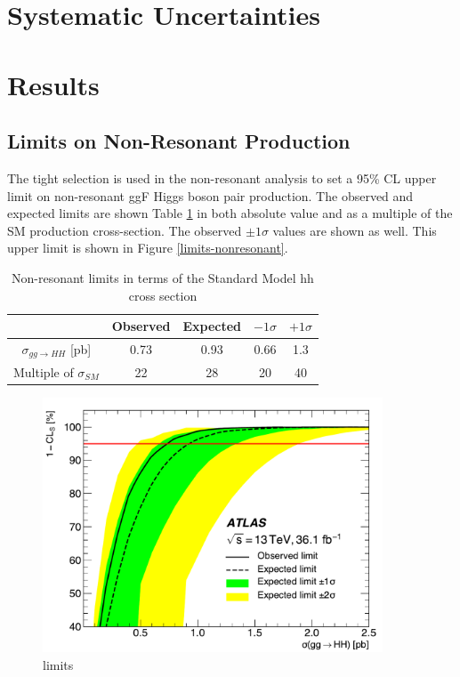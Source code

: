 \section{Systematic Uncertainties}
\section{Results}

\subsection{Limits on Non-Resonant Production}

The tight selection is used in the non-resonant analysis to set a 95\% \gls{CL} upper limit on non-resonant \gls{ggF} Higgs boson pair production. The observed and expected limits are shown Table \ref{tab:nonresonant_results_SM} in both absolute value and as a multiple of the \gls{SM} production cross-section. The observed $\pm 1\sigma$ values are shown as well. This upper limit is shown in Figure \ref{limits-nonresonant}.

\begin{table}[htbp]
  \centering 
  \caption{Non-resonant limits in terms of the Standard Model hh cross section}
  \label{tab:nonresonant_results_SM} 

  \begin{tabular}{ccccc}
  \hline
  & Observed & Expected & $-1\sigma$  & $+1\sigma$ \\
  \hline
  $\sigma_{gg\rightarrow HH}$ [pb] & 0.73 & 0.93 & 0.66 & 1.3\\
  Multiple of $\sigma_{SM}$ & 22 & 28 & 20 & 40 \\
  \hline
  \end{tabular}
\end{table}

\begin{figure}[htbp]
  \centering
\includegraphics[width=0.9\textwidth]{chapters/chapter5_yybb/images/limits/nonresonant.pdf}
  \caption{limits}
  \label{fig:limits-nonresonant}
\end{figure}

